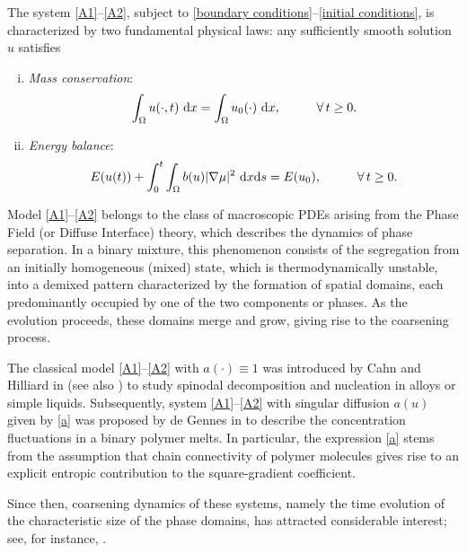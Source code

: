 \documentclass[11pt,  reqno]{amsart}%
\theoremstyle{plain}
\theoremstyle{definition}
\theoremstyle{remark}
\numberwithin{equation}{section}
\newcommand{\dx}{\textup{d}x}
\newcommand{\ds}{\textup{d}s}
\begin{document}
The system \eqref{A1}--\eqref{A2}, subject to \eqref{boundary conditions}--\eqref{initial conditions}, is characterized by two fundamental physical laws:
any sufficiently smooth solution $u$ satisfies
\begin{enumerate}[i)]
    \item \textit{Mass conservation}:
\begin{equation}
    \label{mass conservation}
    \int_{\Omega} u( \cdot,t) \ \dx = \int_{\Omega} u_{0}(\cdot) \ \dx, \hspace{1.0 cm}\forall \, t \ge 0.
\end{equation}
\item \textit{Energy balance}:
\begin{equation} 
\label{energy balance}
E(u(t)) 
+  \int_0^t \int_\Omega  b(u)|\nabla \mu|^2\ \dx \ds  = 
E(u_0), \hspace{1.0 cm}\forall \, t \ge 0.
\end{equation} 
\end{enumerate}
    
\medskip   
  
Model \eqref{A1}--\eqref{A2} belongs to the class of macroscopic PDEs arising from the Phase Field (or Diffuse Interface) theory, which describes the dynamics of phase separation. In a binary mixture, this phenomenon consists of the segregation from an initially homogeneous (mixed) state, which is thermodynamically unstable, into a demixed pattern characterized by the formation of spatial domains, each predominantly occupied by one of the two components or phases. As the evolution proceeds, these domains merge and grow, giving rise to the coarsening process. 

The classical model \eqref{A1}--\eqref{A2} with $a( \cdot )\equiv 1$ was introduced by Cahn and Hilliard in \cite{CAHN-HILLIARD} (see also \cite{CAHN, HILLIARD}) to study spinodal decomposition and nucleation in alloys or simple liquids. Subsequently, system \eqref{A1}--\eqref{A2} with  singular diffusion $a(u)$ given by \eqref{a} was proposed by de Gennes in \cite{GenJCP} to describe the concentration fluctuations in a binary polymer melts.
In particular, the expression \eqref{a} stems from the assumption that chain connectivity of polymer molecules gives rise to an explicit entropic contribution to the square-gradient coefficient. 

Since then, coarsening dynamics of these systems, namely the time evolution of the characteristic size of the phase domains, has attracted considerable interest; see, for instance, \cite{BINDER, CG1995, CTGM1990, GLOTZER, KO, OE}.
\end{document}
